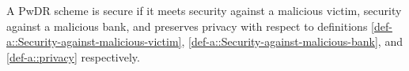 


\vspace{-3mm}
\begin{definition}[Security]\label{def-a::PwDR-security}
A PwDR scheme is secure if it meets security against a malicious victim,  security against a malicious bank, and preserves privacy with respect to definitions \ref{def-a::Security-against-malicious-victim}, \ref{def-a::Security-against-malicious-bank}, and \ref{def-a::privacy} respectively. 
\end{definition}




%  
%  
%   
%   
%   
%   
%   
%
%
%  
%
%
%
%
%













